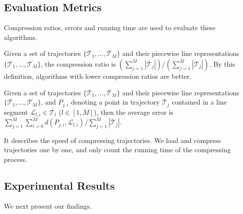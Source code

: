 \subsection{Evaluation Metrics}
Compression ratios, errors and running time are used to evaluate these algorithms.

Given a set of trajectories $\{\dddot{\mathcal{T}_1}, \ldots, \dddot{\mathcal{T}_M}\}$ and their piecewise line representations $\{\overline{\mathcal{T}_1}, \ldots, \overline{\mathcal{T}_M}\}$,
the compression ratio is $(\sum_{j=1}^{M} |\overline{\mathcal{T}}_j |)/(\sum_{j=1}^{M} |\dddot{\mathcal{T}}_j |)$.
By this definition, algorithms with lower compression ratios are better.

Given a set of trajectories $\{\dddot{\mathcal{T}_1}, \ldots, \dddot{\mathcal{T}_M}\}$ and their piecewise line representations
$\{\overline{\mathcal{T}_1}, \ldots, \overline{\mathcal{T}_M}\}$, and $P_{j,i}$ denoting
a point in trajectory $\dddot{\mathcal{T}}_j$ contained in a line segment $\mathcal{L}_{l,i}\in\overline{\mathcal{T}_l}$ ($l\in[1,M]$),
then the average error is $\sum_{j=1}^{M}\sum_{i=0}^{M} d(P_{j,i},
\mathcal{L}_{l,i})/\sum_{j=1}^{M}{|\dddot{\mathcal{T}}_j |}$.

It describes the speed of compressing trajectories. We load and compress trajectories one by one, and only count the running time of the compressing process.

\subsection{Experimental Results}
We next present our findings.


